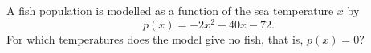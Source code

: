 A fish population is modelled as a function of the sea temperature $x$ by
\[p(x)=-2x^2+40x-72 .\]
For which temperatures does the model give no fish, that is, $p(x)=0$?
